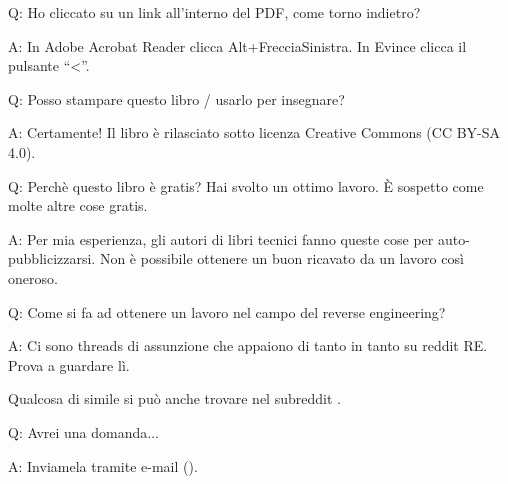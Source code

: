 \par Q: Ho cliccato su un link all'interno del PDF, come torno indietro?
\par A: In Adobe Acrobat Reader clicca Alt+FrecciaSinistra. In Evince clicca il pulsante ``<''.

\par Q: Posso stampare questo libro / usarlo per insegnare?
\par A: Certamente! Il libro è rilasciato sotto licenza Creative Commons (CC BY-SA 4.0).

\par Q: Perchè questo libro è gratis? Hai svolto un ottimo lavoro. È sospetto come molte altre cose gratis.
\par A: Per mia esperienza, gli autori di libri tecnici fanno queste cose per auto-pubblicizzarsi. Non è possibile ottenere un buon ricavato da un lavoro così oneroso.

\par Q: Come si fa ad ottenere un lavoro nel campo del reverse engineering?
\par A: Ci sono threads di assunzione che appaiono di tanto in tanto su reddit RE\FNURLREDDIT{}.
Prova a guardare lì.

Qualcosa di simile si può anche trovare nel subreddit .

\par Q: Avrei una domanda...
\par A: Inviamela tramite e-mail (\EMAIL).

